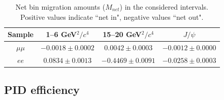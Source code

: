 %
\begin{table}[bh]
\centering
\caption{Net bin migration amounts ($M_{net}$) in the considered \qsq intervals.
Positive values indicate ``net in", negative values ``net out".}
\begin{tabular}{|c|c|c|c|}
\hline
 Sample 			& 1--6 GeV$^2/c^4$ 				& 15--20 GeV$^2/c^4$ 				& $J/\psi$  \\ \hline
$\mu\mu$ 	& $ -0.0018  \pm  0.0002 $ & $ 0.0042  \pm  0.0003 $ & $ -0.0012  \pm  0.0000 $ \\
$ee$ 	& $ 0.0834  \pm  0.0013 $ & $ -0.4469  \pm  0.0091 $ & $ -0.0258  \pm  0.0003 $ \\
\hline 
 \end{tabular}
 \label{tab:bin_mig}
\end{table}


\subsection{PID efficiency}
\label{sec:RKst_pid_eff}

